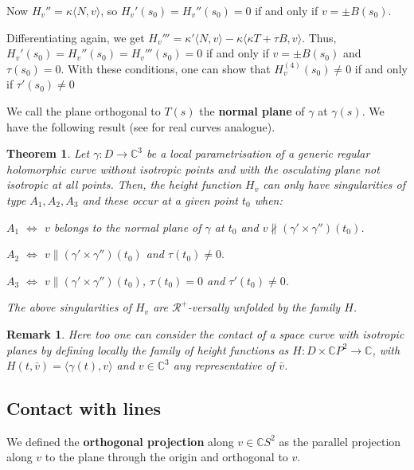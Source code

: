 \documentclass[12pt,a4paper]{article}
\newtheorem{theo}[prop]{Theorem}
\newtheorem{rem}[prop]{Remark}
\begin{document}
Now $H_v''=\kappa \langle N,{v}\rangle$, so $H_v'(s_0)=H_v''(s_0)=0$ if and only if $v=\pm B(s_0)$. 

Differentiating again, we get $H_v'''=\kappa' \langle N,{v}\rangle-\kappa 
\langle \kappa T+\tau B,{v}\rangle$. Thus, $H_v'(s_0)=H_v''(s_0)=H_v'''(s_0)=0$ if and only if 
 $v=\pm B(s_0)$ and $\tau(s_0)=0$. With these conditions, one can show that  $H_v^{(4)}(s_0)\ne 0$ if and only if  $\tau'(s_0)\ne 0$

We call the plane orthogonal to $T(s)$ the {\bf normal plane} of $\gamma$ at $\gamma(s)$. We have the  following result (see \cite{BG} for real curves analogue).

\begin{theo}
Let $\gamma:D\to \mathbb C^3$ be a local parametrisation of a generic regular holomorphic curve without isotropic points and with the 
osculating plane not isotropic at all points.
Then, the height function $H_v$ can only have singularities of type $A_1,A_2,A_3$ and these occur at a given point $t_0$ when:

$A_1$ $\iff$ $v$ belongs to the normal plane of $\gamma$ at $t_0$ and $v \nparallel (\gamma'\times \gamma'')(t_0)$.

$A_2$ $\iff$ $v\parallel (\gamma'\times \gamma'')(t_0)$ and $\tau(t_0)\ne 0.$

$A_3$ $\iff$ $v\parallel (\gamma'\times \gamma'')(t_0)$, $\tau(t_0)=0$ and $\tau'(t_0)\ne 0$.

The above singularities of $H_v$ are $\mathcal R^+$-versally unfolded by the family $H$.
\end{theo}

\begin{rem}
{\rm 
Here too one can consider the contact of a space curve with isotropic planes 
by defining locally the family of height functions 
as $H:D\times \mathbb C P^2\to \mathbb C$, with $H(t,\bar{v})=\langle \gamma(t),{v}\rangle$ and $v\in \mathbb C^3$ any representative of $\bar{v}$.
}
\end{rem}

 
\subsection{Contact with lines}\label{ss:contactLinesCurves}

We defined the {\bf orthogonal projection} along $v\in \mathbb CS^2$ as the parallel projection along $v$ to the plane through the origin and orthogonal to $v$.
\end{document}
